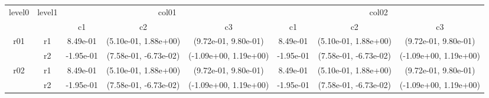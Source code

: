 \begin{tabular}{cccccccc}
\toprule
\multirow{2}{*}{level0} & \multirow{2}{*}{level1}&\multicolumn{3}{c}{col01}&\multicolumn{3}{c}{col02}\tabularnewline
\cmidrule(lr){3-5}
\cmidrule(lr){6-8}
&&c1&c2&c3&c1&c2&c3\tabularnewline
\midrule
\midrule
\multirow{2}{*}{r01}&r1&8.49e-01& (5.10e-01, 1.88e+00)& (9.72e-01, 9.80e-01)&8.49e-01& (5.10e-01, 1.88e+00)& (9.72e-01, 9.80e-01)\tabularnewline
&r2&-1.95e-01& (7.58e-01, -6.73e-02)& (-1.09e+00, 1.19e+00)&-1.95e-01& (7.58e-01, -6.73e-02)& (-1.09e+00, 1.19e+00)\tabularnewline
\midrule
\multirow{2}{*}{r02}&r1&8.49e-01& (5.10e-01, 1.88e+00)& (9.72e-01, 9.80e-01)&8.49e-01& (5.10e-01, 1.88e+00)& (9.72e-01, 9.80e-01)\tabularnewline
&r2&-1.95e-01& (7.58e-01, -6.73e-02)& (-1.09e+00, 1.19e+00)&-1.95e-01& (7.58e-01, -6.73e-02)& (-1.09e+00, 1.19e+00)\tabularnewline
\bottomrule
\end{tabular}
